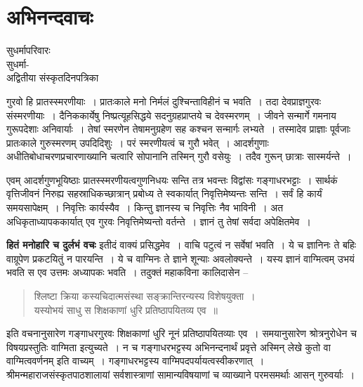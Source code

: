 {\fontsize{15}{17}\selectfont
\chapter{अभिनन्दवाचः}

\begin{center}
\smallskip
सुधर्मापरिवारः\\
सुधर्मा-\\
अद्वितीया संस्कृतदिनपत्रिका
\addrule
\end{center}

गुरवो हि प्रातस्स्मरणीयाः~। प्रातःकाले मनो निर्मलं दुश्चिन्ताविहीनं च भवति~। तदा देवप्राज्ञगुरवः संस्मरणीयाः~। दैनिककार्येषु निष्प्रत्यूहसिद्धये सदनुग्रहप्राप्तये च देवस्मरणम्~। जीवने सन्मार्गे गमनाय गुरूपदेशाः अनिवार्याः~। तेषां स्मरणेन तेषामनुग्रहेण सह कश्चन सन्मार्गः लभ्यते~। तस्मादेव प्राज्ञाः पूर्वजाः प्रातःकाले गुरुस्मरणम् उपदिदिशुः~। परं स्मरणीयत्वं च गुरौ भवेत्~। आदर्शगुणाः अधीतिबोधाचरणप्रचारणाख्यानि चत्वारि सोपानानि तस्मिन् गुरौ वसेयुः~। तदैव गुरून् छात्राः सास्मर्यन्ते~। 

एवम् आदर्शगुणभूयिष्ठाः प्रातस्स्मरणीयत्वगुणनिधयः सन्ति तत्र भवन्तः विद्वांसः गङ्गाधरभट्टाः~। सार्थकं वृत्तिजीवनं निरुह्य सहस्राधिकच्छात्रान् प्रबोध्य ते स्वकार्यात् निवृत्तिमेष्यन्तः सन्ति~। सर्वं हि कार्यं समयसापेक्षम्~। निवृत्तिः कार्यस्यैव~। किन्तु ज्ञानस्य च निवृत्तिः नैव भाविनी~। अत अधिकृताध्यापककार्यात् एव गुरवः निवृत्तिमेष्यन्तो वर्तन्ते~। ज्ञानं तु तेषां सर्वदा अपेक्षितमेव~।

\textbf{हितं मनोहारि च दुर्लभं वचः} इतीदं वाक्यं प्रसिद्धमेव~। वाचि पटुत्वं न सर्वेषां भवति~। ये च ज्ञानिनः ते बहिः वाग्रूपेण प्रकटयितुं न पारयन्ति~। ये च वाग्मिनः ते ज्ञाने शून्याः अवलोक्यन्ते~। यस्य ज्ञानं वाग्मित्वम् उभयं भवति स एव उत्तमः अध्यापकः भवति~। तदुक्तं महाकविना कालिदासेन --

\begin{verse}
श्लिष्टा क्रिया कस्यचिदात्मसंस्था सङ्क्रान्तिरन्यस्य विशेषयुक्ता~।\\
यस्योभयं साधु स शिक्षकाणां धुरि प्रतिष्ठापयितव्य एव~॥
\end{verse}

इति वचनानुसारेण गङ्गाधरगुरवः शिक्षकाणां धुरि नूनं प्रतिष्ठापयितव्याः एव~। समयानुसारेण श्रोत्रनुरोधेन च विषयप्रस्तुतिः वाग्मिता इत्युच्यते~। न च गङ्गाधरभट्टस्य अभिनन्दनार्थं प्रवृत्ते अस्मिन् लेखे कुतो वा वाग्मित्ववर्णनम् इति वाच्यम्~। गङ्गाधरभट्टस्य वाग्मिपदपर्यायत्वस्वीकरणात्~। श्रीमन्महाराजसंस्कृतपाठशालायां सर्वशास्त्राणां सामान्यविषयाणां च व्याख्याने परमसमर्थाः आसन् गुरुवर्याः~। 

}
